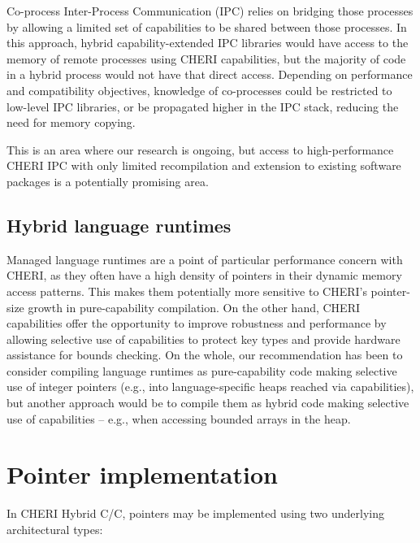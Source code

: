 \documentclass[12pt,twoside,openright,a4paper]{article}
\newcommand{\note}[2]{{\color{blue}[ Note: #1 - #2]}}
\renewcommand{\note}[2]{\relax\ifhmode\unskip\fi}
\newcommand{\psnote}[1]{\note{#1}{Peter S.}}
\newcommand{\dcnote}[1]{\note{#1}{David}}
\newcommand*{\cpp}{\texorpdfstring{C\textsmaller[2]{\protect\nolinebreak[4]\hspace{-.05em}\raisebox{.45ex}{\textbf{++}}}}{C++}}
\newcommand*{\COrCpp}{C/\cpp{}}
\newcommand*{\CHERIhybridCOrCpp}{CHERI Hybrid \COrCpp{}}
\begin{document}
Co-process Inter-Process Communication (IPC) relies on bridging those
processes by allowing a limited set of capabilities to be shared between those
processes.
In this approach, hybrid capability-extended IPC libraries would have access
to the memory of remote processes using CHERI capabilities, but the majority
of code in a hybrid process would not have that direct access.
Depending on performance and compatibility objectives, knowledge of
co-processes could be restricted to low-level IPC libraries, or be propagated
higher in the IPC stack, reducing the need for memory copying.

This is an area where our research is ongoing, but access to high-performance
CHERI IPC with only limited recompilation and extension to existing software
packages is a potentially promising area.

\subsection{Hybrid language runtimes}

Managed language runtimes are a point of particular performance concern with
CHERI, as they often have a high density of pointers in their dynamic memory
access patterns.
This makes them potentially more sensitive to CHERI's pointer-size growth in
pure-capability compilation.
On the other hand, CHERI capabilities offer the opportunity to improve
robustness and performance by allowing selective use of capabilities to
protect key types and provide hardware assistance for bounds checking.
On the whole, our recommendation has been to consider compiling language
runtimes as pure-capability code making selective use of integer pointers
(e.g., into language-specific heaps reached via capabilities), but
another approach would be to compile them as hybrid code making selective use
of capabilities -- e.g., when accessing bounded arrays in the heap.
\dcnote{It feels quite dangerous to have a single sentence about the
recommended way of doing things and a long document about the not-recommended
way.}

\section{Pointer implementation}

\psnote{In hybrid CHERI C/C++...}

In \CHERIhybridCOrCpp{}, pointers may be implemented using two underlying
architectural types:
\end{document}
